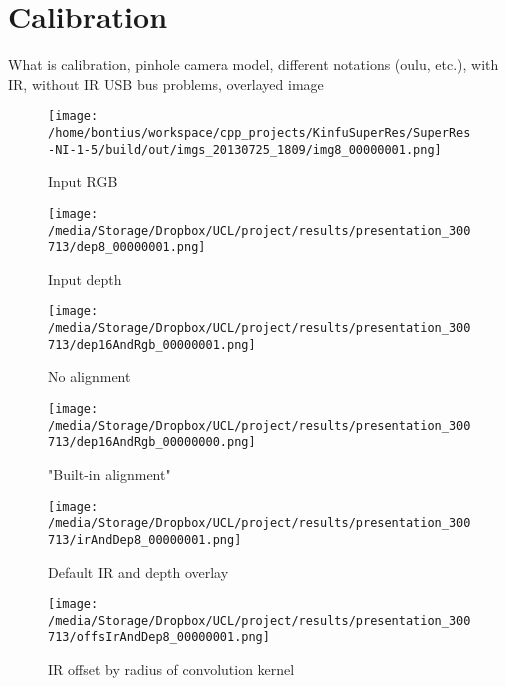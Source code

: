 \documentclass{ucl_thesis}
\begin{document}
\section{Calibration}
\label{sec:calibration}

What is calibration, pinhole camera model, different notations (oulu, etc.), 
with IR, without IR
USB bus problems, overlayed image

\begin{figure}[h!]\centering
    \begin{minipage}[b]{0.49\linewidth}
        \texttt{[image: /home/bontius/workspace/cpp\_projects/KinfuSuperRes/SuperRes-NI-1-5/build/out/imgs\_20130725\_1809/img8\_00000001.png]}
        \caption{Input RGB}
    \end{minipage}
    \begin{minipage}[b]{0.49\linewidth}
        \texttt{[image: /media/Storage/Dropbox/UCL/project/results/presentation\_300713/dep8\_00000001.png]}
		\caption{Input depth}
    \end{minipage}
\end{figure}

\begin{figure}[h!]\centering
	\begin{minipage}[b]{0.49\linewidth}
		\texttt{[image: /media/Storage/Dropbox/UCL/project/results/presentation\_300713/dep16AndRgb\_00000001.png]}
		\caption{No alignment}
	\end{minipage}
	\begin{minipage}[b]{0.49\linewidth}
		\texttt{[image: /media/Storage/Dropbox/UCL/project/results/presentation\_300713/dep16AndRgb\_00000000.png]}
		\caption{"Built-in alignment"}
	\end{minipage}
\end{figure}


\begin{figure}[h!]\centering
    \begin{minipage}[b]{0.49\linewidth} \label{fig:ir}
        \texttt{[image: /media/Storage/Dropbox/UCL/project/results/presentation\_300713/irAndDep8\_00000001.png]}
        \caption{Default IR and depth overlay}
    \end{minipage}
    \begin{minipage}[b]{0.49\linewidth}
        \texttt{[image: /media/Storage/Dropbox/UCL/project/results/presentation\_300713/offsIrAndDep8\_00000001.png]}
        \caption{IR offset by radius of convolution kernel}
    \end{minipage}
\end{figure}
\end{document}
